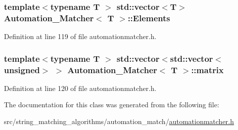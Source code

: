 \subsubsection[{Elements}]{\setlength{\rightskip}{0pt plus 5cm}template$<$typename T $>$ std\+::vector$<$T$>$ {\bf Automation\+\_\+\+Matcher}$<$ T $>$\+::Elements\hspace{0.3cm}{\ttfamily [private]}}\label{class_automation___matcher_aa459af0a82dba703653cbef2dffed577}


Definition at line 119 of file automationmatcher.\+h.

\hypertarget{class_automation___matcher_a06be1889b30f1c180a5325d2694fb995}{}
\subsubsection[{matrix}]{\setlength{\rightskip}{0pt plus 5cm}template$<$typename T $>$ std\+::vector$<$std\+::vector$<$unsigned$>$ $>$ {\bf Automation\+\_\+\+Matcher}$<$ T $>$\+::matrix\hspace{0.3cm}{\ttfamily [private]}}\label{class_automation___matcher_a06be1889b30f1c180a5325d2694fb995}


Definition at line 120 of file automationmatcher.\+h.



The documentation for this class was generated from the following file\+:\begin{DoxyCompactItemize}
\item 
src/string\+\_\+matching\+\_\+algorithms/automation\+\_\+match/\hyperlink{automationmatcher_8h}{automationmatcher.\+h}\end{DoxyCompactItemize}
